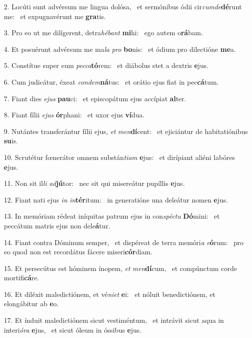2. Locúti sunt advérsum me lingua dolósa, \dag\  et sermónibus ódii cir\textit{cum}\textit{de}\textbf{dé}runt me: \ast\  et expugnavérunt me \textbf{gra}tis.\

3. Pro eo ut me dilígerent, detra\textit{hé}\textit{bant} \textbf{mi}hi: \ast\  ego autem o\textbf{rá}bam.\

4. Et posuérunt advérsum me ma\textit{la} \textit{pro} \textbf{bo}nis: \ast\  et ódium pro dilectióne \textbf{me}a.\

5. Constítue super eum \textit{pec}\textit{ca}\textbf{tó}rem: \ast\  et diábolus stet a dextris \textbf{e}jus.\

6. Cum judicátur, éxeat \textit{con}\textit{dem}\textbf{ná}tus: \ast\  et orátio ejus fiat in pec\textbf{cá}tum.\

7. Fiant dies \textit{e}\textit{jus} \textbf{pau}ci: \ast\  et episcopátum ejus accípiat \textbf{al}ter.\

8. Fiant fílii \textit{e}\textit{jus} \textbf{ór}phani: \ast\  et uxor ejus \textbf{ví}dua.\

9. Nutántes transferántur fílii ejus, \textit{et} \textit{men}\textbf{dí}cent: \ast\  et ejiciántur de habitatiónibus \textbf{su}is.\

10. Scrutétur fœnerátor omnem substán\textit{ti}\textit{am} \textbf{e}jus: \ast\  et dirípiant aliéni labóres \textbf{e}jus.\

11. Non sit il\textit{li} \textit{ad}\textbf{jú}tor: \ast\  nec sit qui misereátur pupíllis \textbf{e}jus.\

12. Fiant nati ejus \textit{in} \textit{in}\textbf{tér}itum: \ast\  in generatióne una deleátur nomen \textbf{e}jus.\

13. In memóriam rédeat iníquitas patrum ejus in con\textit{spéc}\textit{tu} \textbf{Dó}mini: \ast\  et peccátum matris ejus non dele\textbf{á}tur.\

14. Fiant contra Dóminum semper, \dag\  et dispéreat de terra memóri\textit{a} \textit{e}\textbf{ó}rum: \ast\  pro eo quod non est recordátus fácere miseri\textbf{cór}diam.\

15. Et persecútus est hóminem ínopem, \textit{et} \textit{men}\textbf{dí}cum, \ast\  et compúnctum corde mortifi\textbf{cá}re.\

16. Et diléxit maledictiónem, et vé\textit{ni}\textit{et} \textbf{e}i: \ast\  et nóluit benedictiónem, et elongábitur ab \textbf{e}o.\

17. Et índuit maledictiónem sicut vestiméntum, \dag\  et intrávit sicut aqua in interi\textit{ó}\textit{ra} \textbf{e}jus, \ast\  et sicut óleum in óssibus \textbf{e}jus.\

